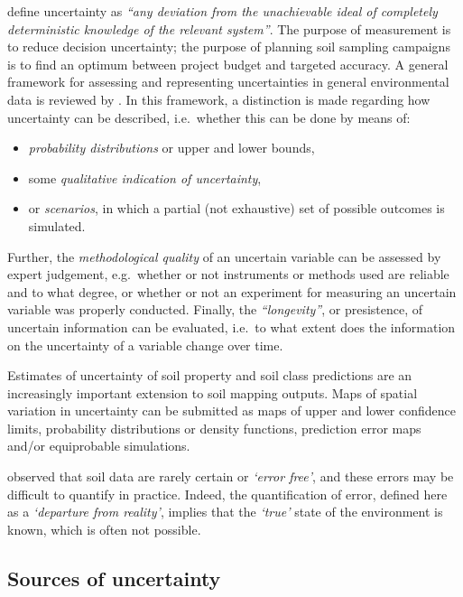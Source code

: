 \documentclass[graybox,natbib,nospthms,UStrade]{svmono}
\let\BeginKnitrBlock\begin \let\EndKnitrBlock\end
\let\BeginKnitrBlock\begin \let\EndKnitrBlock\end
\begin{document}
\citet{Walker2003IA} define uncertainty as \emph{``any deviation from the
unachievable ideal of completely deterministic knowledge of the relevant
system''}. The purpose of measurement is to reduce decision uncertainty;
the purpose of planning soil sampling campaigns is to find an optimum
between project budget and targeted accuracy. A general framework for
assessing and representing uncertainties in general environmental data
is reviewed by \citet{Refsgaard2007UEM}. In this framework, a distinction is
made regarding how uncertainty can be described, i.e.~whether this can
be done by means of:

\begin{itemize}
\item
  \emph{probability distributions} or upper and lower bounds,
\item
  some \emph{qualitative indication of uncertainty},
\item
  or \emph{scenarios}, in which a partial (not exhaustive) set of possible
  outcomes is simulated.
\end{itemize}

Further, the \emph{methodological quality} of an uncertain variable can be
assessed by expert judgement, e.g.~whether or not instruments or methods used are
reliable and to what degree, or whether or not an experiment for
measuring an uncertain variable was properly conducted. Finally, the
\emph{``longevity''}, or presistence, of uncertain information can be evaluated, i.e.~to what
extent does the information on the uncertainty of a variable change over
time.

\BeginKnitrBlock{rmdnote}
Estimates of uncertainty of soil
property and soil class predictions are an increasingly important
extension to soil mapping outputs. Maps of spatial variation in uncertainty can be submitted
as maps of upper and lower confidence limits, probability distributions
or density functions, prediction error maps and/or equiprobable
simulations.
\EndKnitrBlock{rmdnote}

\citet{Heuvelink2006Elsevier} observed that soil data are rarely certain or
\emph{`error free'}, and these errors may be difficult to quantify in
practice. Indeed, the quantification of error, defined here as a
\emph{`departure from reality'}, implies that the \emph{`true'} state of the
environment is known, which is often not possible.

\hypertarget{sources-uncertainty}{%
\subsection{Sources of uncertainty}\label{sources-uncertainty}}
\end{document}
